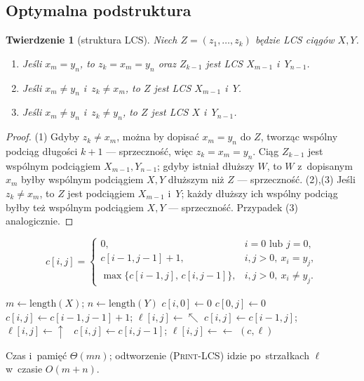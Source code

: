\documentclass[11pt,a4paper]{article}
\theoremstyle{plain}
\newtheorem{twierdzenie}{Twierdzenie}[section]
\theoremstyle{definition}
\begin{document}
\subsection*{Optymalna podstruktura}
\begin{twierdzenie}[struktura LCS]\label{tw:lcs}
Niech $Z=(z_1,\dots,z_k)$ będzie LCS ciągów $X,Y$.
\begin{enumerate}[label=(\arabic*)]
\item Jeśli $x_m=y_n$, to $z_k=x_m=y_n$ oraz $Z_{k-1}$ jest LCS $X_{m-1}$ i~$Y_{n-1}$.
\item Jeśli $x_m\ne y_n$ i~$z_k\ne x_m$, to $Z$ jest LCS $X_{m-1}$ i~$Y$.
\item Jeśli $x_m\ne y_n$ i~$z_k\ne y_n$, to $Z$ jest LCS $X$ i~$Y_{n-1}$.
\end{enumerate}
\end{twierdzenie}
\begin{proof}
(1) Gdyby $z_k\ne x_m$, można by dopisać $x_m=y_n$ do $Z$, tworząc wspólny podciąg długości $k+1$ ---
sprzeczność, więc $z_k=x_m=y_n$. Ciąg $Z_{k-1}$ jest wspólnym podciągiem $X_{m-1},Y_{n-1}$; gdyby istniał
dłuższy $W$, to $W$ z~dopisanym $x_m$ byłby wspólnym podciągiem $X,Y$ dłuższym niż $Z$ --- sprzeczność.
(2),(3) Jeśli $z_k\ne x_m$, to $Z$ jest podciągiem $X_{m-1}$ i~$Y$; każdy dłuższy ich wspólny podciąg byłby
też wspólnym podciągiem $X,Y$ --- sprzeczność. Przypadek (3) analogicznie.
\end{proof}
\[
c[i,j]=\begin{cases}0,& i=0\text{ lub }j=0,\\
c[i-1,j-1]+1,& i,j>0,\ x_i=y_j,\\
\max\{c[i-1,j],\,c[i,j-1]\},& i,j>0,\ x_i\ne y_j.\end{cases}
\]

\begin{algorithm}[H]
\caption{LCS($X,Y$)}
\begin{algorithmic}[1]
\State $m\gets\mathrm{length}(X)$; $n\gets\mathrm{length}(Y)$
 $c[i,0]\gets0$ \EndFor
{} $c[0,j]\gets0$ \EndFor
{}
     $c[i,j]\gets c[i-1,j-1]+1$; $\ell[i,j]\gets\nwarrow$
     $c[i,j]\gets c[i-1,j]$; $\ell[i,j]\gets\uparrow$
    \Else\ $c[i,j]\gets c[i,j-1]$; $\ell[i,j]\gets\leftarrow$
    \EndIf
  \EndFor
\EndFor
\State \Return $(c,\ell)$
\end{algorithmic}
\end{algorithm}
Czas i~pamięć $\Theta(mn)$; odtworzenie (\textsc{Print-LCS}) idzie po~strzałkach $\ell$ w~czasie $O(m+n)$.
\end{document}
